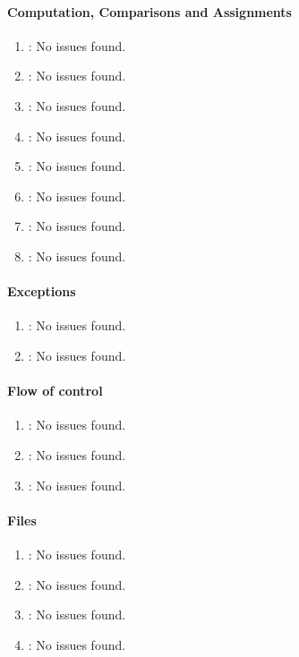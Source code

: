\paragraph{Computation, Comparisons and Assignments} %
\label{par:computation_comparisons_and_assignments}

\begin{enumerate} [resume]
	\item \emph{\checkAR}: No issues found.
	\item \emph{\checkAS}: No issues found.
	\item \emph{\checkAT}: No issues found.
	\item \emph{\checkAU}: No issues found.
	\item \emph{\checkAV}: No issues found.
	\item \emph{\checkAW}: No issues found.
	\item \emph{\checkAX}: No issues found.
	\item \emph{\checkAY}: No issues found.
\end{enumerate}

\paragraph{Exceptions} %
\label{par:exceptions}

\begin{enumerate} [resume]
	\item \emph{\checkAZ}: No issues found.
	\item \emph{\checkBA}: No issues found.
\end{enumerate}

\paragraph{Flow of control} %
\label{par:flow_of_control}

\begin{enumerate} [resume]
	\item \emph{\checkBB}: No issues found.
	\item \emph{\checkBC}: No issues found.
	\item \emph{\checkBD}: No issues found.
\end{enumerate}

\paragraph{Files} %
\label{par:files}

\begin{enumerate} [resume]
	\item \emph{\checkBE}: No issues found.
	\item \emph{\checkBF}: No issues found.
	\item \emph{\checkBG}: No issues found.
	\item \emph{\checkBH}: No issues found.
\end{enumerate}
